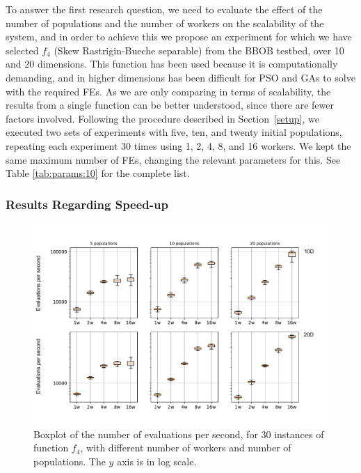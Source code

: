 \documentclass[review]{elsarticle}
\begin{document}
To answer the first research question, we need to evaluate the effect of the
number of populations and the number of workers on the scalability of the
system, and in order to achieve this we propose an experiment for
which we have selected $f_4$ (Skew
Rastrigin-Bueche separable) from the BBOB testbed, over 10 and 20 dimensions. This function has been used
because it is computationally demanding, and in higher dimensions has been
difficult for PSO \cite{el2009black} and GAs \cite{nicolau2009application} to
solve with the required FEs. As we are only comparing in terms of scalability,
the results from a single function can be better understood, since there are
fewer factors involved. Following the procedure described in
Section~\ref{setup}, we executed two sets of experiments with five, ten, and twenty
initial populations, repeating each experiment 30 times using 1, 2, 4, 8, and 16
workers. We kept the same maximum number of FEs, changing the relevant
parameters for this. See Table \ref{tab:params:10} for the complete list.

\subsubsection{Results Regarding Speed-up}
\label{sec:speedup}

\begin{figure}[h!tbp]
  \centering
  \includegraphics[width=\textwidth]{eval_ratio}
  \caption{Boxplot of the number of evaluations per second, for 30 instances of function $f_4$,
          with different number of workers and number of populations. The $y$ axis is in log scale.}
  \label{fig:spworker:evalspersecond}
\end{figure}
\end{document}
